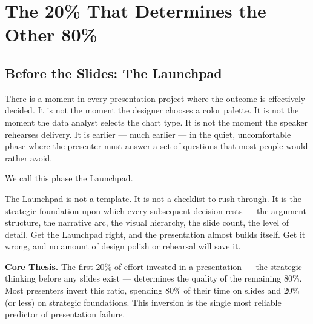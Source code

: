 
\section{The 20\% That Determines the Other 80\%}



\subsection{Before the Slides: The Launchpad}

There is a moment in every presentation project where the outcome is effectively decided. It is not the moment the designer chooses a color palette. It is not the moment the data analyst selects the chart type. It is not the moment the speaker rehearses delivery. It is earlier --- much earlier --- in the quiet, uncomfortable phase where the presenter must answer a set of questions that most people would rather avoid.

We call this phase the Launchpad.

The Launchpad is not a template. It is not a checklist to rush through. It is the strategic foundation upon which every subsequent decision rests --- the argument structure, the narrative arc, the visual hierarchy, the slide count, the level of detail. Get the Launchpad right, and the presentation almost builds itself. Get it wrong, and no amount of design polish or rehearsal will save it.

\begin{thesisbox}
\textbf{Core Thesis.} The first 20\% of effort invested in a presentation --- the strategic thinking before any slides exist --- determines the quality of the remaining 80\%. Most presenters invert this ratio, spending 80\% of their time on slides and 20\% (or less) on strategic foundations. This inversion is the single most reliable predictor of presentation failure.
\end{thesisbox}

